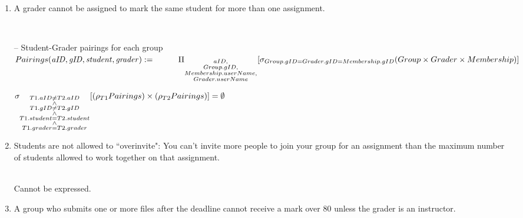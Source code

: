 \documentclass{article}
\newcommand{\var}[1]{\mathit{#1}}
\begin{document}
\begin{enumerate}

\item   %
A grader cannot be assigned to mark the same student for more than one assignment.

{~}\\ %
{\large %
-- Student-Grader pairings for each group \\[5pt]
$
Pairings(\var{aID, gID, student, grader}) := \\[5pt]
    \hspace*{1cm}
    \Pi_{\substack{aID, \\ Group.gID, \\ Membership.userName, \\ Grader.userName}}
	[\sigma_{Group.gID = Grader.gID = Membership.gID}
	(Group \times Grader \times Membership)] \\[10pt]
$

$
\sigma_{\substack{T1.aID \neq T2.aID \\ \wedge \\ T1.gID \neq T2.gID \\ \wedge \\ T1.student = T2.student \\ \wedge \\ T1.grader = T2.grader}} 
[(\rho_{T1}Pairings) \times (\rho_{T2}Pairings)] = \emptyset \\[10pt]
$
} %

\newpage

\item   %
Students are not allowed to ``overinvite": 
You can't invite more people to join your group for an assignment
than the maximum number of students allowed to work together on that assignment.

{~}\\ %
{\large %
Cannot be expressed. \\[10pt]
} %

\newpage

\item   %
A group who submits one or more files after the deadline cannot receive a mark over 80
unless the grader is an instructor.


\end{enumerate}
\end{document}
